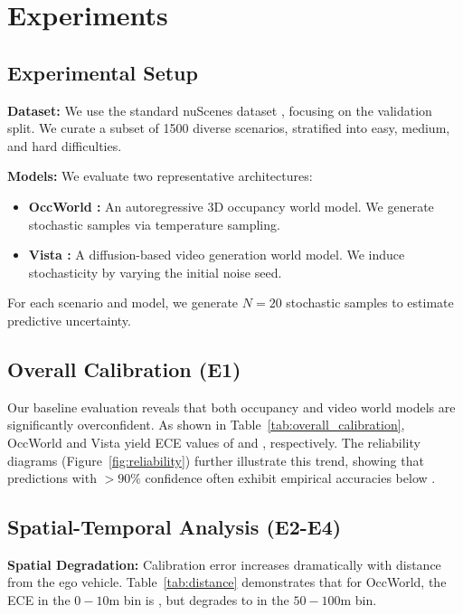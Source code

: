 \section{Experiments}
\label{sec:experiments}

\subsection{Experimental Setup}
\textbf{Dataset:} We use the standard nuScenes dataset \cite{caesar2020nuscenes}, focusing on the validation split. We curate a subset of 1500 diverse scenarios, stratified into easy, medium, and hard difficulties. 

\textbf{Models:} We evaluate two representative architectures:
\begin{itemize}
    \item \textbf{OccWorld \cite{zheng2024occworld}:} An autoregressive 3D occupancy world model. We generate stochastic samples via temperature sampling.
    \item \textbf{Vista \cite{gao2024vista}:} A diffusion-based video generation world model. We induce stochasticity by varying the initial noise seed.
\end{itemize}
For each scenario and model, we generate $N=20$ stochastic samples to estimate predictive uncertainty.



\subsection{Overall Calibration (E1)}
Our baseline evaluation reveals that both occupancy and video world models are significantly overconfident. As shown in Table~\ref{tab:overall_calibration}, OccWorld and Vista yield ECE values of  and , respectively. The reliability diagrams (Figure~\ref{fig:reliability}) further illustrate this trend, showing that predictions with $>90\%$ confidence often exhibit empirical accuracies below . 

\subsection{Spatial-Temporal Analysis (E2-E4)}
\textbf{Spatial Degradation:} Calibration error increases dramatically with distance from the ego vehicle. Table~\ref{tab:distance} demonstrates that for OccWorld, the ECE in the $0-10$m bin is , but degrades to  in the $50-100$m bin.

